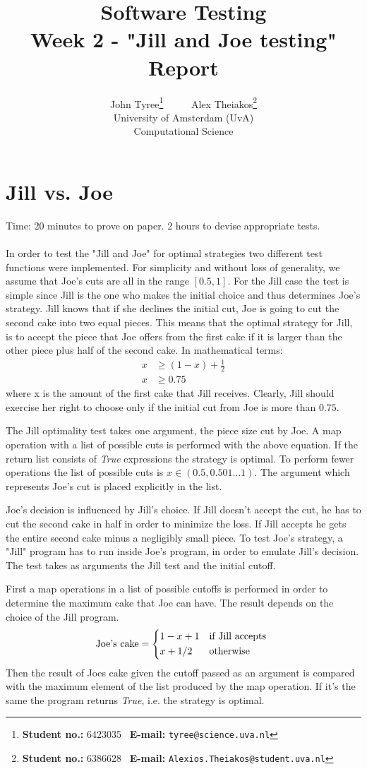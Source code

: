 \documentclass[11pt,a4paper]{article}
\title{\large{\textbf{Software Testing}} \\ [5pt]
\large{Week 2 - "Jill and Joe testing" Report}
}
\author{John Tyree\footnote{\textbf{Student no.:} 6423035 \textbar\ \textbf{E-mail:} \texttt{tyree@science.uva.nl}} \ \ \ \ \ Alex Theiakos\footnote{\textbf{Student no.:} 6386628 \textbar\ \textbf{E-mail:} \texttt{Alexios.Theiakos@student.uva.nl}} \\[15pt] University of Amsterdam (UvA) \\ Computational Science}
\date{}
\numberwithin{equation}{section}%
\begin{document}
\maketitle

\section{Jill vs. Joe}
Time: 20 minutes to prove on paper. 2 hours to devise appropriate tests. \\ \\
In order to test the "Jill and Joe" for optimal strategies two different test functions were implemented. For simplicity and without loss of generality, we assume that Joe's cuts are all in the range $[0.5, 1]$.
For the Jill case the test is simple since Jill is the one who makes the initial choice and thus determines Joe's strategy. Jill knows that if she declines the initial cut, Joe is going to cut the second cake into two equal pieces.
This means that the optimal strategy for Jill, is to accept the piece that Joe offers from the first cake if it is larger than the other piece plus half of the second cake. In mathematical terms:
\begin{align*}
    x &\geq (1 - x) + \frac{1}{2} \\
    x &\geq 0.75
\end{align*}
where x is the amount of the first cake that Jill receives.
Clearly, Jill should exercise her right to choose only if the initial cut from Joe is more than $0.75$.

The Jill optimality test takes one argument, the piece size cut by Joe. A map operation with a list of possible cuts is performed with the above equation. If the return list consists of \emph{True} expressions the strategy is optimal. To perform fewer operations the list of possible cuts is $x\in (0.5,0.501...1)$. The argument which represents Joe's cut is placed explicitly in the list.

Joe's decision is influenced by Jill's choice. If Jill doesn't accept the cut, he has to cut the second cake in half in order to minimize the loss. If Jill accepts he gets the entire second cake minus a negligibly small piece.
To test Joe's strategy, a "Jill" program has to run inside Joe's program, in order to emulate Jill's decision. The test takes as arguments the Jill test and the initial cutoff. 

First a map operations in a list of possible cutoffs is performed in order to determine the maximum cake that Joe can have. The result depends on the choice of the Jill program.
\[
    \text{Joe's cake} =
    \begin{dcases*}
        1 - x + 1 & if Jill accepts \\
        x + 1/2 & otherwise
    \end{dcases*}
\]
Then the result of Joes cake given the cutoff passed as an argument is compared with the maximum element of the list produced by the map operation. If it's the same the program returns \emph{True}, i.e. the strategy is optimal.
\end{document}

